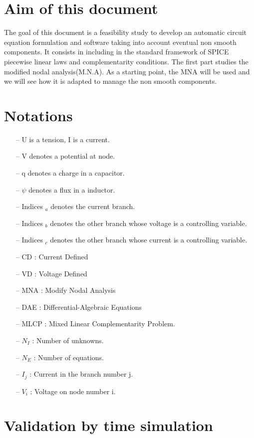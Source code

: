 
 \newpage
 \section{Aim of this document}
 The goal of this document is a feasibility study to develop an automatic circuit equation
 formulation and software taking into account eventual non smooth components. It consists in including in the standard framework of SPICE piecewise linear laws  and complementarity conditions. The first part studies the modified nodal analysis(M.N.A). As a starting point, the
 MNA will be used and we will see how it is adapted to manage the non smooth components.
 \section{Notations}
\begin{itemize}
  \item[--] U is a tension, I is a current.
  \item[--] V denotes a potential at node.
  \item[--] q denotes a charge in a capacitor.
  \item[--] $\psi$ denotes a flux in a inductor.
  \item[--] Indices $_{a}$ denotes the current branch.
  \item[--] Indices $_{b}$ denotes the other branch whose voltage is a controlling variable.
  \item[--] Indices $_{c}$ denotes the other branch whose current is a controlling variable.
\item[--] CD : Current Defined
\item[--] VD : Voltage Defined
\item[--] MNA : Modify Nodal Analysis
\item[--] DAE : Differential-Algebraic Equations
\item[--] MLCP : Mixed Linear Complementarity Problem.
\item[--] $N_{I}$ : Number of unknowns.
\item[--] $N_{E}$ : Number of equations.
\item[--] $I_{j}$ : Current in the branch number j.
\item[--] $V_{i}$ : Voltage on node number i.
\end{itemize}


\section{Validation by time simulation}

